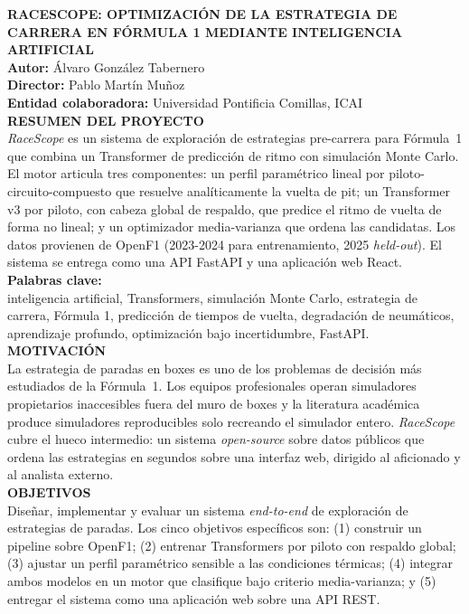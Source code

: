 \documentclass[12pt, a4paper]{book}
\begin{document}
\cleardoublepage

\noindent
\textbf{\large RACESCOPE: OPTIMIZACIÓN DE LA ESTRATEGIA DE CARRERA EN FÓRMULA 1 MEDIANTE INTELIGENCIA ARTIFICIAL}\\

\noindent
\textbf{Autor:} Álvaro González Tabernero\\
\textbf{Director:} Pablo Martín Muñoz\\
\textbf{Entidad colaboradora:} Universidad Pontificia Comillas, ICAI\\

\noindent
\textbf{RESUMEN DEL PROYECTO}\\
\textit{RaceScope} es un sistema de exploración de estrategias pre-carrera para Fórmula~1 que combina un Transformer de predicción de ritmo con simulación Monte Carlo. El motor articula tres componentes: un perfil paramétrico lineal por piloto-circuito-compuesto que resuelve analíticamente la vuelta de pit; un Transformer v3 por piloto, con cabeza global de respaldo, que predice el ritmo de vuelta de forma no lineal; y un optimizador media-varianza que ordena las candidatas. Los datos provienen de OpenF1 (2023-2024 para entrenamiento, 2025 \textit{held-out}). El sistema se entrega como una API FastAPI y una aplicación web React.\\

\noindent \textbf{Palabras clave:}\\
inteligencia artificial, Transformers, simulación Monte Carlo, estrategia de carrera,
Fórmula 1, predicción de tiempos de vuelta, degradación de neumáticos,
aprendizaje profundo, optimización bajo incertidumbre, FastAPI.\\

\noindent \textbf{MOTIVACIÓN}\\
La estrategia de paradas en boxes es uno de los problemas de decisión más estudiados de la Fórmula~1. Los equipos profesionales operan simuladores propietarios inaccesibles fuera del muro de boxes y la literatura académica produce simuladores reproducibles solo recreando el simulador entero. \textit{RaceScope} cubre el hueco intermedio: un sistema \textit{open-source} sobre datos públicos que ordena las estrategias en segundos sobre una interfaz web, dirigido al aficionado y al analista externo.\\

\noindent \textbf{OBJETIVOS}\\
Diseñar, implementar y evaluar un sistema \textit{end-to-end} de exploración de estrategias de paradas. Los cinco objetivos específicos son: (1) construir un pipeline sobre OpenF1; (2) entrenar Transformers por piloto con respaldo global; (3) ajustar un perfil paramétrico sensible a las condiciones térmicas; (4) integrar ambos modelos en un motor que clasifique bajo criterio media-varianza; y (5) entregar el sistema como una aplicación web sobre una API REST.\\
\end{document}
